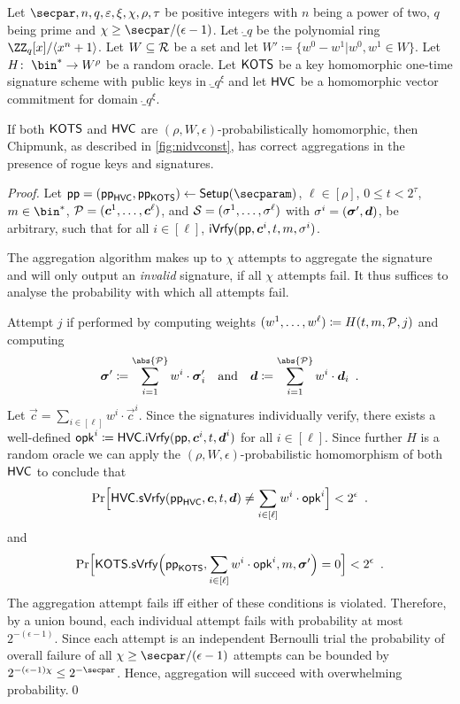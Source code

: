 \begin{lemma}\label{lem:msigaggcorrect}
  Let $\secpar,n,q,\varepsilon,\xi,\chi,\rho,\tau$ be positive integers with $n$ being a power of two, $q$ being prime and $\chi \geq \secpar/(\epsilon-1)$.
Let $\ring_q$ be the polynomial ring $\ZZ_q[x]/\langle x^n+1\rangle$.
Let $W \subseteq \mathcal{R}$ be a set and let $W' \coloneqq \{w^0-w^1| w^0,w^1 \in W\}$.
Let $H\colon\; \bin^* \to W^\rho$ be a random oracle.
Let $\mathsf{KOTS}$ be a key homomorphic one-time signature scheme with public keys in $\ring_q^\xi$ and let $\mathsf{HVC}$ be a homomorphic vector commitment for domain $\ring_q^\xi$.

If both $\mathsf{KOTS}$ and $\mathsf{HVC}$ are $(\rho,W,\epsilon)$-probabilistically homomorphic, then Chipmunk, as described in \autoref{fig:nidvconst}, has correct aggregations in the presence of rogue keys and signatures.
\end{lemma}
\begin{proof}
  Let $\params = (\params_\hvc,\params_\hots)\gets\setup(\secparam)$, $\ell \in [\rho]$, $0\leq t< 2^\tau$, $m\in\bin^*$, $\mathcal{P} = (\boldsymbol{c}^1,\dots,\boldsymbol{c}^\ell)$, and $\mathcal{S} = (\sigma^1,\dots,\sigma^\ell)$ with 
  $\sigma^i=(\boldsymbol{\sigma}',\boldsymbol{d})$, be arbitrary, such that for all $i\in[\ell]$, $\mathsf{iVrfy}(\mathsf{pp},\boldsymbol{c}^i,t,m,\sigma^i)$.
  
  The aggregation algorithm makes up to $\chi$ attempts to aggregate the signature and will only output an \emph{invalid} signature, if all $\chi$ attempts fail.
  It thus suffices to analyse the probability with which all attempts fail.
  
  Attempt $j$ if performed by computing weights $(w^1,\dots,w^\ell) \coloneqq H(t,m,\mathcal{P},j)$ and computing 
  \[
    \otsig \coloneqq \sum_{i=1}^{\abs{\pubkeys}} w^i\cdot \otsig_i \quad \text{and}\quad \vec{d} \coloneqq \sum_{i=1}^{\abs{\pubkeys}} w^i\cdot \vec{d}_i\enspace.
  \]
  Let $\vec{c} = \sum_{i\in[\ell]}w^i\cdot\vec{c}^i$.
  Since the signatures individually verify, there exists a well-defined $\mathsf{opk}^i \coloneqq \mathsf{HVC}.\mathsf{iVrfy}(\mathsf{pp},\boldsymbol{c}^i,t,\boldsymbol{d}^i)$ for all $i\in[\ell]$.
  Since further $H$ is a random oracle we can apply the $(\rho,W,\epsilon)$-probabilistic homomorphism of both $\mathsf{HVC}$ to conclude that
  \[
    \Pr\Bigl[\mathsf{HVC}.\mathsf{sVrfy}(\mathsf{pp}_{\mathsf{HVC}},\boldsymbol{c},t,\boldsymbol{d}) \neq \sum_{i\in[\ell]} w^i\cdot\mathsf{opk}^i\Bigr] < 2^{\-\epsilon}\enspace.
  \]
  and
  \[
    \Pr\Bigl[\mathsf{KOTS}.\mathsf{sVrfy}\Bigl(\mathsf{pp}_{\mathsf{KOTS}},\sum_{i\in[\ell]} w^i\cdot\mathsf{opk}^i, m, \boldsymbol{\sigma}'\Bigr) = 0\Bigr] < 2^{\-\epsilon}\enspace.
  \]
  The aggregation attempt fails iff either of these conditions is violated.
  Therefore, by a union bound, each individual attempt fails with probability at most $2^{-(\epsilon-1)}$.
  Since each attempt is an independent Bernoulli trial the probability of overall failure of all $\chi\geq \secpar/(\epsilon-1)$ attempts can be bounded by $2^{-(\epsilon-1)\chi} \leq 2^{-\secpar}$.
  Hence, aggregation will succeed with overwhelming probability.\qed
\end{proof}

